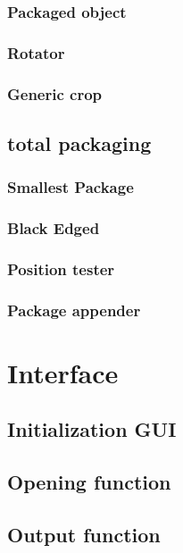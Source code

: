 \documentclass[10pt]{article}
\begin{document}
\subsubsection{Packaged object}

\subsubsection{Rotator}

\subsubsection{Generic crop}


\subsection{total packaging}
\subsubsection{Smallest Package}

\subsubsection{Black Edged}

\subsubsection{Position tester}

\subsubsection{Package appender}


\section{Interface}
\subsection{Initialization GUI}

\subsection{Opening function}

\subsection{Output function}

\end{document}
